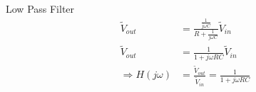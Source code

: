\documentclass[aspectratio=169]{beamer}
\begin{document}
\begin{frame}{Low Pass Filter}
    \begin{align}
        \widetilde{V}_{out} &= \frac{\frac{1}{j \omega C}}{R + \frac{1}{j \omega C}} \widetilde{V}_{in} \\
        \widetilde{V}_{out} &= \frac{1}{1 + j \omega RC} \widetilde{V}_{in} \\
        \Rightarrow H(j \omega) &= \frac{\widetilde{V}_{out}}{\widetilde{V}_{in}} = \frac{1}{1 + j \omega RC}
    \end{align}
\end{frame}
\end{document}

